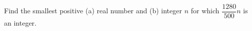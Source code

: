 Find the smallest positive (a) real number and (b) integer $ n $ for which $\dfrac{1280}{500}n $ is an integer.
